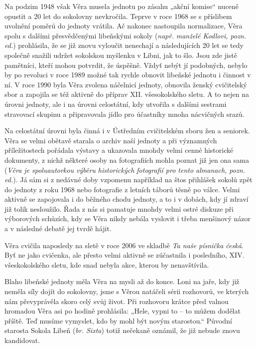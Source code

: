 Na podzim 1948 však Věra musela jednotu po zásahu „akční komise`` nuceně
opustit a 20 let do sokolovny nevkročila. Teprve v roce 1968 se s
příslibem uvolnění poměrů do jednoty vrátila. Ač nakonec nastoupila
normalizace, Věra spolu s dalšími přesvědčenými libeňskými sokoly
(\emph{např. manželé Kodlovi, pozn. ed.}) prohlásila, že se již znovu
vyloučit nenechají a následujících 20 let se tedy společně snažili
udržet sokolskou myšlenku v Libni, jak to šlo. Jsou zde jistě pamětníci,
kteří mohou potvrdit, že úspěšně. Vždyť nebýt jí podobných, nebylo by po
revoluci v roce 1989 možné tak rychle obnovit libeňské jednotu i činnost
v ní. V roce 1990 byla Věra zvolena náčelnicí jednoty, obnovila ženský
cvičitelský sbor a zapojila se též aktivně do příprav XII. všesokolského
sletu. A to nejen na úrovni jednoty, ale i na úrovni celostátní, kdy
utvořila s dalšími sestrami stravovací skupinu a připravovala jídlo pro
účastníky mnoha nácvičných srazů.

Na celostátní úrovni byla činná i v Ústředním cvičitelském sboru žen a
seniorek. Věra se velmi obětavě starala o archiv naší jednoty a při
významných příležitostech pořádala výstavy a ukazovala mnohdy velmi
cenné historické dokumenty, z nichž některé osoby na fotografiích mohla
poznat již jen ona sama (\emph{Věra je spoluautorkou výběru historických
fotografií pro tento almanach, pozn. ed.}). Já sám si z nedávné doby
vzpomenu například na štos přihlášek sokolů zpět do jednoty z roku 1968
nebo fotografie z letních táborů těsně po válce. Velmi aktivně se
zapojovala i do běžného chodu jednoty, a to i v dobách, kdy jí zdraví
již tolik nesloužilo. Řada z nás si pamatuje mnohdy velmi ostré diskuze
při výborových schůzích, kdy se Věra nikdy nebála vyslovit i třeba
menšinový názor a v následné debatě jej tvrdě hájit.

Věra cvičila naposledy na sletě v roce 2006 ve skladbě \emph{Ta naše
písnička česká}. Byť ne jako cvičenka, ale přesto velmi aktivně se
zúčastnila i posledního, XIV. všeskokolského sletu, kde snad nebyla
akce, kterou by nenavštívila.

Blaho libeňské jednoty měla Věra na mysli až do konce. Loni na jaře, kdy
již neměla síly dojít do sokolovny, jsme s Věrou natáčeli sérii
rozhovorů, ve kterých nám převyprávěla skoro celý svůj život. Při
rozhovoru krátce před valnou hromadou Věra asi po hodině prohlásila:
„Hele, vypni to -- to můžem dodělat příště. Teď musíme vymyslet, kdo by
mohl být novým starostou.`` Původní starosta Sokola Libeň (\emph{br.
Sixta}) totiž nečekaně oznámil, že již nebude znovu kandidovat.

